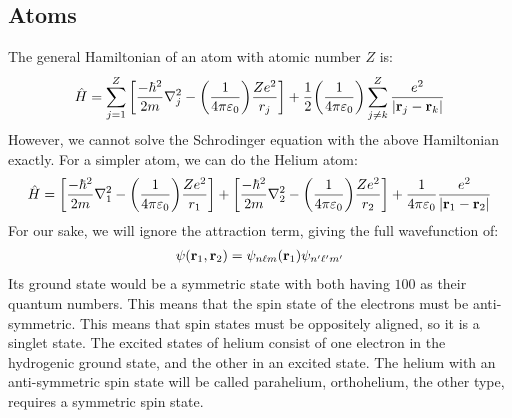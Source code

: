 \subsection{Atoms}
The general Hamiltonian of an atom with atomic number $Z$ is:
\begin{align*}
  \hat{H}=\sum_{j=1}^{Z}\qty[\dfrac{-\hbar^2}{2m}\laplacian_j-
    \qty(\dfrac{1}{4\pi\veps_0})\dfrac{Ze^2}{r_j}]
  +\dfrac{1}{2}\qty(\dfrac{1}{4\pi\veps_0})\sum_{j\neq k}^Z
  \dfrac{e^2}{\abs{\vb{r}_j-\vb{r}_k}}
\end{align*}
However, we cannot solve the Schrodinger equation with the above Hamiltonian exactly. For a simpler atom, we can do the Helium atom:
\begin{align*}
  \hat{H}=
  \qty[\dfrac{-\hbar^2}{2m}\laplacian_1-\qty(\dfrac{1}{4\pi\veps_0})\dfrac{Ze^2}{r_1}]
  +\qty[\dfrac{-\hbar^2}{2m}\laplacian_2-\qty(\dfrac{1}{4\pi\veps_0})\dfrac{Ze^2}{r_2}]
  +\dfrac{1}{4\pi\veps_0}\dfrac{e^2}{\abs{\vb{r}_1-\vb{r}_2}}
\end{align*}
For our sake, we will ignore the attraction term, giving the full wavefunction of:
\begin{align*}
  \psi(\vb{r}_1,\vb{r}_2)=\psi_{n\ell m}(\vb{r}_1)\psi_{n'\ell'm'}
\end{align*}
Its ground state would be a symmetric state with both having $100$ as their quantum numbers. This means that the spin state of the electrons must be anti-symmetric. This means that spin states must be oppositely aligned, so it is a singlet state. The excited states of helium consist of one electron in the hydrogenic ground state, and the other in an excited state. The helium with an anti-symmetric spin state will be called parahelium, orthohelium, the other type, requires a symmetric spin state.
